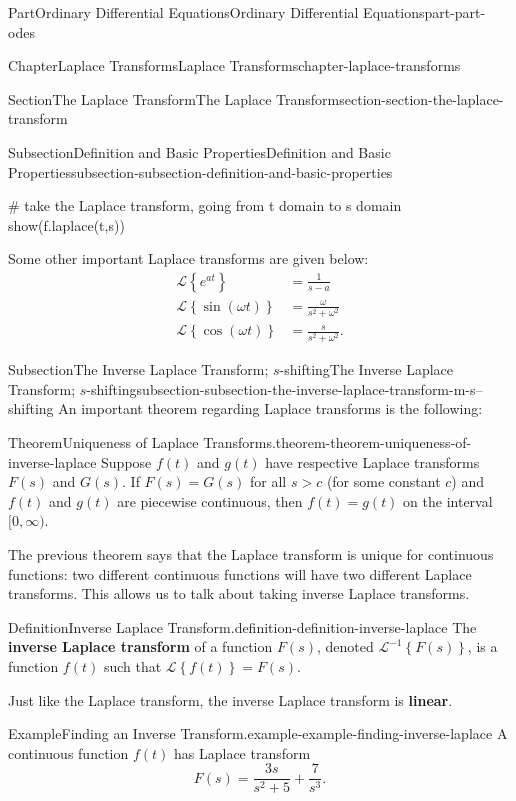 \documentclass[twoside,10pt,]{book}
\newcommand{\terminology}[1]{\textbf{#1}}
\numberwithin{equation}{part}
\newcommand{\Laplace}[1]{\mathcal{L}\set{#1}}
\newcommand{\set}[1]{\left\{ #1 \right\}}
\newcommand{\gt}{>}
\begin{document}
\begin{partptx}{Part}{Ordinary Differential Equations}{}{Ordinary Differential Equations}{}{}{part-part-odes}
\begin{chapterptx}{Chapter}{Laplace Transforms}{}{Laplace Transforms}{}{}{chapter-laplace-transforms}
\begin{sectionptx}{Section}{The Laplace Transform}{}{The Laplace Transform}{}{}{section-section-the-laplace-transform}
\begin{subsectionptx}{Subsection}{Definition and Basic Properties}{}{Definition and Basic Properties}{}{}{subsection-subsection-definition-and-basic-properties}
\begin{sageinput}
# take the Laplace transform, going from t domain to s domain
show(f.laplace(t,s))
\end{sageinput}
%
\par
Some other important Laplace transforms are given below:%
\begin{align*}
\Laplace{e^{at}} &= \frac{1}{s-a}\\
\Laplace{\sin(\omega t)} &= \frac{\omega}{s^{2}+\omega^{2}}\\
\Laplace{\cos(\omega t)} &= \frac{s}{s^{2}+\omega^{2}}\text{.}
\end{align*}
%
\end{subsectionptx}
%
%
\typeout{************************************************}
\typeout{************************************************}
%
\begin{subsectionptx}{Subsection}{The Inverse Laplace Transform; \(s\)-shifting}{}{The Inverse Laplace Transform; \(s\)-shifting}{}{}{subsection-subsection-the-inverse-laplace-transform-m-s--shifting}
An important theorem regarding Laplace transforms is the following:%
\begin{theorem}{Theorem}{Uniqueness of Laplace Transforms.}{}{theorem-theorem-uniqueness-of-inverse-laplace}%
Suppose \(f(t)\) and \(g(t)\) have respective Laplace transforms \(F(s)\) and \(G(s)\). If \(F(s) = G(s)\) for all \(s\gt c\) (for some constant \(c\)) and \(f(t)\) and \(g(t)\) are piecewise continuous, then \(f(t) = g(t)\) on the interval \([0,\infty)\).%
\end{theorem}
The previous theorem says that the Laplace transform is unique for continuous functions: two different continuous functions will have two different Laplace transforms. This allows us to talk about taking inverse Laplace transforms.%
\begin{definition}{Definition}{Inverse Laplace Transform.}{definition-definition-inverse-laplace}%
The \terminology{inverse Laplace transform} of a function \(F(s)\), denoted \(\mathcal{L}^{-1}\left\{F(s)\right\}\), is a function \(f(t)\) such that \(\Laplace{f(t)} = F(s)\).%
\end{definition}
Just like the Laplace transform, the inverse Laplace transform is \terminology{linear}.%
\begin{example}{Example}{Finding an Inverse Transform.}{example-example-finding-inverse-laplace}%
A continuous function \(f(t)\) has Laplace transform%
\begin{equation*}
F(s) = \frac{3s}{s^{2}+5} + \frac{7}{s^{3}}.

\end{equation*}
\end{example}
\end{subsectionptx}
\end{sectionptx}
\end{chapterptx}
\end{partptx}
\end{document}
